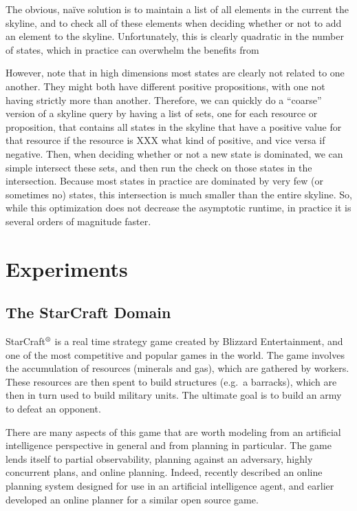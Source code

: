 \documentclass[letterpaper]{article}
\theoremstyle{plain} \newtheorem{theorem}{Theorem} \newtheorem{proposition}{Proposition} \newtheorem{lemma}{Lemma}
\theoremstyle{definition} \newtheorem{definition}{Definition} \newtheorem{conjecture}{Conjecture} \newtheorem*{example}{Example}
\theoremstyle{remark} \newtheorem*{remark}{Remark} \newtheorem*{note}{Note} \newtheorem{case}{Case}
\begin{document}
The obvious, na\"ive solution is to maintain a list of all elements
in the current the skyline, and to check all of these elements when
deciding whether or not to add an element to the skyline. Unfortunately,
this is clearly quadratic in the number of states, which in practice
can overwhelm the benefits from

However, note that in high dimensions most states are clearly not
related to one another.  They might both have different positive
propositions, with one not having strictly more than another.
Therefore, we can quickly do a ``coarse'' version of a skyline query
by having a list of sets, one for each resource or proposition,
that contains all states in the skyline that have a positive value
for that resource if the resource is XXX what kind of positive, and
vice versa if negative. Then, when deciding whether or not a new
state is dominated, we can simple intersect these sets, and then
run the check on those states in the intersection. Because most
states in practice are dominated by very few (or sometimes no)
states, this intersection is much smaller than the entire skyline.
So, while this optimization does not decrease the asymptotic runtime,
in practice it is several orders of magnitude faster.



\section{Experiments}

\subsection{The StarCraft Domain}

StarCraft$^\textrm{\textregistered}$ is a real time strategy game
created by Blizzard Entertainment, and one of the most competitive
and popular games in the world. The game involves the accumulation
of resources (minerals and gas), which are gathered by workers.
These resources are then spent to build structures (e.g.\ a barracks),
which are then in turn used to build military units. The ultimate goal is
to build an army to defeat an opponent.


There are many aspects of this game that are worth modeling from
an artificial intelligence perspective in general and from planning
in particular. The game lends itself to partial observability,
planning against an adversary, highly concurrent plans, and online
planning.  Indeed, \citet{churchill11build} recently described an
online planning system designed for use in an artificial intelligence
agent, and \citet{chan07online} earlier developed an online planner
for a similar open source game.
\end{document}
